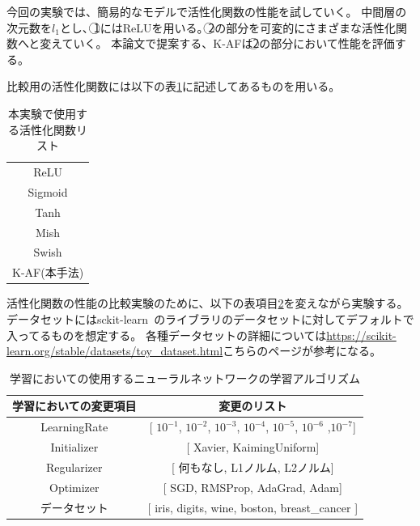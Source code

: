 今回の実験では、簡易的なモデルで活性化関数の性能を試していく。
中間層の次元数を$ l_1 $とし、\textcircled{\scriptsize 1}にはReLUを用いる。\textcircled{\scriptsize 2}の部分を可変的にさまざまな活性化関数へと変えていく。
本論文で提案する、K-AFは\textcircled{\scriptsize 2}の部分において性能を評価する。

比較用の活性化関数には以下の表\ref{list:af_table}に記述してあるものを用いる。


\begin{table}[htbp]
    \begin{center}
        \caption{本実験で使用する活性化関数リスト}
        \label{list:af_table}
        \vspace{2mm} 
        \begin{tabular}{ |c| }
        \hline
        ReLU \\
        Sigmoid \\
        Tanh   \\
        Mish  \\
        Swish  \\
        K-AF(本手法)   \\
        \hline
        \end{tabular}
    \end{center}
\end{table}



活性化関数の性能の比較実験のために、以下の表項目\ref{list:learning_algorithm_change}を変えながら実験する。
データセットにはsckit-learn~\cite{scikit-learn}のライブラリのデータセットに対してデフォルトで入ってるものを想定する。
各種データセットの詳細については\url{https://scikit-learn.org/stable/datasets/toy_dataset.html}こちらのページが参考になる。


\begin{table}[htbp]
    \begin{center}
        \caption{学習においての使用するニューラルネットワークの学習アルゴリズム}
        \label{list:learning_algorithm_change}
        \vspace{2mm} 
        \begin{tabular}{ |c|c| }
        \hline
        学習においての変更項目 & 変更のリスト\\
        \hline
        LearningRate           & [  $10^{-1}$,  $10^{-2}$,  $10^{-3}$,  $10^{-4}$, $10^{-5}$, $10^{-6}$ ,$10^{-7}$]    \\
        \hline
        Initializer         & [ Xavier, KaimingUniform]   \\
        \hline
        Regularizer           & [ 何もなし, L1ノルム, L2ノルム]     \\
        \hline
        Optimizer         & [ SGD, RMSProp, AdaGrad, Adam]   \\
        \hline
        データセット &  [ iris, digits, wine, boston, breast\_cancer ]    \\
        \hline
        \end{tabular}
    \end{center}
\end{table}


